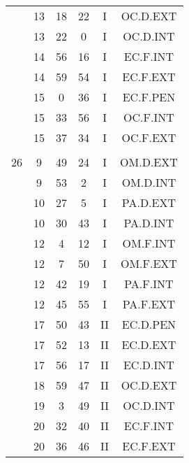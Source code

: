 \documentclass[12pt, a4paper]{article}
\begin{document}
\begin{multicols}{3}
{\begin{tabular}{c c c c c c}
	 	 	 	 & 13 & 18 & 22 & I & OC.D.EXT\\%
	 	 	 	 & 13 & 22 & 0 & I & OC.D.INT\\%
	 	 	 	 & 14 & 56 & 16 & I & EC.F.INT\\%
	 	 	 	 & 14 & 59 & 54 & I & EC.F.EXT\\%
	 	 	 	 & 15 & 0 & 36 & I & EC.F.PEN\\%
	 	 	 	 & 15 & 33 & 56 & I & OC.F.INT\\%
	 	 	 	 & 15 & 37 & 34 & I & OC.F.EXT\\%
	 	 	 	 & & & & & \\%
	 	 	 	26 & 9 & 49 & 24 & I & OM.D.EXT\\%
	 	 	 	 & 9 & 53 & 2 & I & OM.D.INT\\%
	 	 	 	 & 10 & 27 & 5 & I & PA.D.EXT\\%
	 	 	 	 & 10 & 30 & 43 & I & PA.D.INT\\%
	 	 	 	 & 12 & 4 & 12 & I & OM.F.INT\\%
	 	 	 	 & 12 & 7 & 50 & I & OM.F.EXT\\%
	 	 	 	 & 12 & 42 & 19 & I & PA.F.INT\\%
	 	 	 	 & 12 & 45 & 55 & I & PA.F.EXT\\%
	 	 	 	 & 17 & 50 & 43 & II & EC.D.PEN\\%
	 	 	 	 & 17 & 52 & 13 & II & EC.D.EXT\\%
	 	 	 	 & 17 & 56 & 17 & II & EC.D.INT\\%
	 	 	 	 & 18 & 59 & 47 & II & OC.D.EXT\\%
	 	 	 	 & 19 & 3 & 49 & II & OC.D.INT\\%
	 	 	 	 & 20 & 32 & 40 & II & EC.F.INT\\%
	 	 	 	 & 20 & 36 & 46 & II & EC.F.EXT\\%

\end{tabular}}
\end{multicols}
\end{document}
